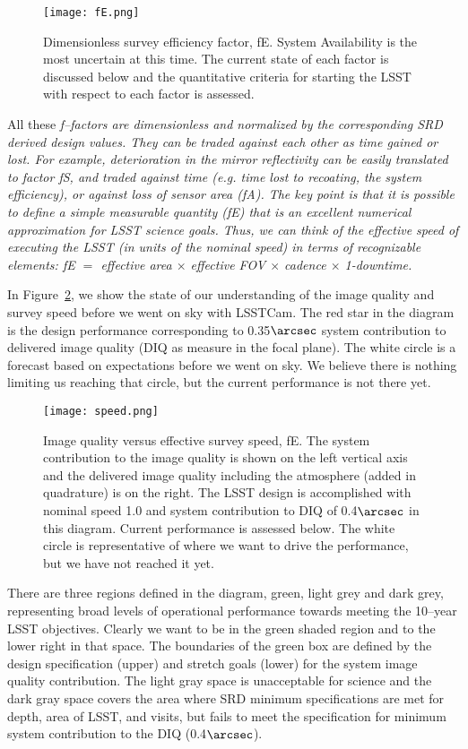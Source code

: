 \begin{figure}%
\centering
\texttt{[image: fE.png]}
\caption{Dimensionless survey efficiency factor, fE. System Availability is the most uncertain at this time. The current state of each factor is discussed below and the quantitative criteria for starting the LSST with respect to each factor is assessed.}
\label{fE}
\end{figure}

All these \it{f--factors} are dimensionless and normalized by the corresponding SRD derived design values. They can be traded against each other as time gained or lost.
For example, deterioration in the mirror reflectivity can be easily translated to factor fS, and traded against time (e.g. time lost to recoating, the system efficiency), or against loss of sensor area (fA).
The key point is that it is possible to define a simple measurable quantity (fE) that is an excellent numerical approximation for LSST science goals. Thus, we can think of the effective speed of executing the LSST (in units of the nominal speed) in terms of recognizable elements:  fE $=$ effective area $\times$ effective FOV $\times$ cadence $\times$ 1-downtime.

In Figure~\ref{speed}, we show the state of our understanding of the image quality and survey speed before we went on sky with LSSTCam. The red star in the diagram is the design performance corresponding to 0.35$\arcsec$ system contribution to delivered image quality (DIQ as measure in the focal plane). The white circle is a forecast based on expectations before we went on sky. We believe there is nothing limiting us reaching that circle, but the current performance is not there yet. 

\begin{figure}[t]
\centering
\texttt{[image: speed.png]}
\caption{Image quality versus effective survey speed, fE. The system contribution to the image quality is shown on the left vertical axis and the delivered image quality including the atmosphere (added in quadrature) is on the right. The LSST design is accomplished with nominal speed 1.0 and system contribution to DIQ of 0.4$\arcsec$ in this diagram. Current performance is assessed below. The white circle is representative of where we want to drive the performance, but we have not reached it yet.}
\label{speed}
\end{figure}

There are three regions defined in the diagram, green, light grey and dark grey, representing broad levels of operational performance towards meeting the 10--year LSST objectives. Clearly we want to be in the green shaded region and to the lower right in that space. The boundaries of the green box are defined by the design specification (upper) and stretch goals (lower) for the system image quality contribution.  The light gray space is unacceptable for science and the dark gray space covers the area where SRD minimum specifications are met for depth, area of LSST, and visits, but fails to meet the specification for minimum system contribution to the DIQ (0.4$\arcsec$). 


